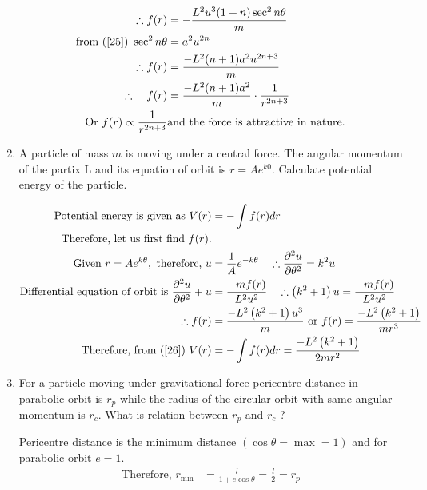 \begin{enumerate}
\begin{answer}
\begin{align}
		\therefore f(r)&=-\frac{L^{2} u^{3}(1+n) \sec ^{2} n \theta}{m}\notag\\
		\text{from (\ref{25}) }\sec ^{2} n \theta&=a^{2} u^{2 n}\notag\\
		\therefore f(r)&=\frac{-L^{2}(n+1) a^{2} u^{2 n+3}}{m}\notag\\
		\therefore \quad f(r)&=\frac{-L^{2}(n+1) a^{2}}{m} \cdot \frac{1}{r^{2 n+3}}\notag\\
		\text{Or }
		f(r) \propto \frac{1}{r^{2 n+3}}&
		\text{and the force is attractive in nature.}\notag
		\end{align}
	\end{answer}
	\item  A particle of mass $m$ is moving under a central force. The angular momentum of the partix $\mathrm{L}$ and its equation of orbit is $r=A e^{k 0}$. Calculate potential energy of the particle.
	\begin{answer}
		\begin{align}
		\text{Potential energy is given as }V(r)&=-\int f(r) d r\label{26}\\
		\text{	Therefore, let us first find $f(r)$.}&\notag\\
		\text{Given }r=A e^{k \theta},\text{ thereforc, }u&=\frac{1}{A} e^{-k \theta} \quad \therefore \frac{\partial^{2} u}{\partial \theta^{2}}=k^{2} u\notag\\
		\text{Differential equation of orbit is }\frac{\partial^{2} u}{\partial \theta^{2}}+u&=\frac{-m f(r)}{L^{2} u^{2}} \quad \therefore\left(k^{2}+1\right) u=\frac{-m f(r)}{L^{2} u^{2}}\notag\\
		\therefore f(r)&=\frac{-L^{2}\left(k^{2}+1\right) u^{3}}{m} \text { or } f(r)=\frac{-L^{2}\left(k^{2}+1\right)}{m r^{3}}\notag\\
		\text{Therefore, from (\ref*{26}) }V(r)&=-\int f(r) d r=\frac{-L^{2}\left(k^{2}+1\right)}{2 m r^{2}}\notag
		\end{align}
	\end{answer}
	\item  For a particle moving under gravitational force pericentre distance in parabolic orbit is $r_{p}$ while the radius of the circular orbit with same angular momentum is $r_{c}$. What is relation between $r_{p}$ and $r_c$ ?
	\begin{answer}
		Pericentre distance is the minimum distance $(\cos \theta=\max =1)$ and for parabolic orbit $e=1 .$
		\begin{align*}
		\text{Therefore, }r_{\min }&=\frac{l}{1+e \cos \theta}=\frac{l}{2}=r_{p}\\

\end{align*}
\end{answer}
\end{enumerate}
